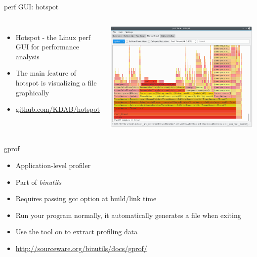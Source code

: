 \begin{frame}{perf GUI: hotspot}
  \begin{columns}
    \begin{itemize}
    \item Hotspot - the Linux perf GUI for performance analysis
    \item The main feature of hotspot is visualizing a  file graphically
    \item \href{https://github.com/KDAB/hotspot}{github.com/KDAB/hotspot}
    \end{itemize}
    \includegraphics[width=\textwidth]{slides/sysdev-application-development/hotspot.png}
  \end{columns}
\end{frame}

\begin{frame}{gprof}
  \begin{itemize}
  \item Application-level profiler
  \item Part of {\em binutils}
  \item Requires passing gcc  option at build/link time
  \item Run your program normally, it automatically generates a
     file when exiting
  \item Use the  tool on  to extract
    profiling data
  \item \url{http://sourceware.org/binutils/docs/gprof/}
  \end{itemize}
\end{frame}

